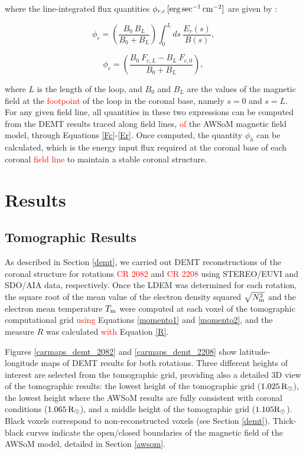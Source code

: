\documentclass[namedreferences]{solarphysics}
\def\edit#1{\textcolor{Red}{#1}}
\newcommand{\mrsun}{{\rm R_\odot}}
\newcommand{\Tm}{T_{\rm m}}
\newcommand{\Nsqm}{N^2_{{\rm m}}}
\newcommand{\sqravgN}{\sqrt{\Nsqm}}
\begin{document}
\begin{article}
{\noindent
where the {line-integrated} flux quantities $\phi_{r,c}\,[\rm{erg\,sec^{-1}\,cm^{-2}}]$ are given by \citep{maccormack_2017}:}

\begin{equation}\label{phi_r}
\phi_r = \left( \frac{B_0 \ B_L}{B_0 + B_L} \right) \int_{0}^{L} ds \ \frac{E_r(s)}{B(s)},
\end{equation}

\begin{equation}\label{phi_c}
\phi_c = \left( \frac{B_0 \ F_{c,L} - B_L \ F_{c,0}}{B_0 + B_L} \right) ,
\end{equation}

\noindent 
{where $L$ is the length of the loop, and $B_0$ and $B_L$ are the values of the magnetic field at the \edit{footpoint} of the loop in the coronal base, namely $s=0$ and $s=L$.} {{For} any given field line, all quantities in these two expressions can be computed {from the DEMT results traced along field lines, \edit{of} the AWSoM magnetic field model,} through Equations \ref{Fc}-\ref{Er}. Once computed, the quantity $\phi_h$ can be calculated, which is the energy input flux required at the coronal base of each coronal \edit{field line} to maintain a stable coronal structure.}

\section{Results}\label{resu} 

\subsection{Tomographic Results}\label{demt_res} 

{As described in Section \ref{demt}, we carried out DEMT reconstructions of the coronal structure for rotations \edit{CR 2082} and \edit{CR 2208} using STEREO/EUVI and SDO/AIA data, respectively.} {Once the LDEM was determined for each rotation, the square root of the mean value of the electron density squared $\sqravgN$ and the electron mean temperature $\Tm$ were computed at each voxel of the tomographic computational grid \edit{using} Equations \ref{momento1} and \ref{momento2}{, and the measure $R$ was calculated \edit{with} Equation \ref{R}.}} 

Figures \ref{carmaps_demt_2082} and \ref{carmaps_demt_2208} show {latitude-longitude} maps of DEMT results for both {rotations. Three different heights {of interest are selected from the tomographic grid}, providing also a detailed 3D view of the tomographic results: the lowest height of {the} tomographic grid ($1.025\,\mrsun$), {the lowest height where the AWSoM results are fully} consistent with coronal conditions ($1.065\,\mrsun$), and a middle height of the tomographic grid ($1.105\mrsun$)}. Black voxels correspond to non-reconstructed voxels ({see} Section \ref{demt}). Thick-black {curves indicate} the {open/closed boundaries of the magnetic field of the} AWSoM model{, detailed in Section \ref{awsom}.} 


\end{article}
\end{document}
